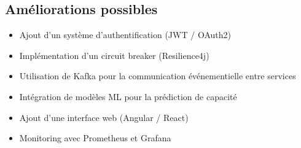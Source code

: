 \documentclass[12pt,a4paper]{report}
\begin{document}
\subsection*{Am\'eliorations possibles}

\begin{itemize}
    \item Ajout d'un syst\`eme d'authentification (JWT / OAuth2)
    \item Impl\'ementation d'un circuit breaker (Resilience4j)
    \item Utilisation de Kafka pour la communication \'ev\'enementielle entre services
    \item Int\'egration de mod\`eles ML pour la pr\'ediction de capacit\'e
    \item Ajout d'une interface web (Angular / React)
    \item Monitoring avec Prometheus et Grafana
\end{itemize}
\end{document}
